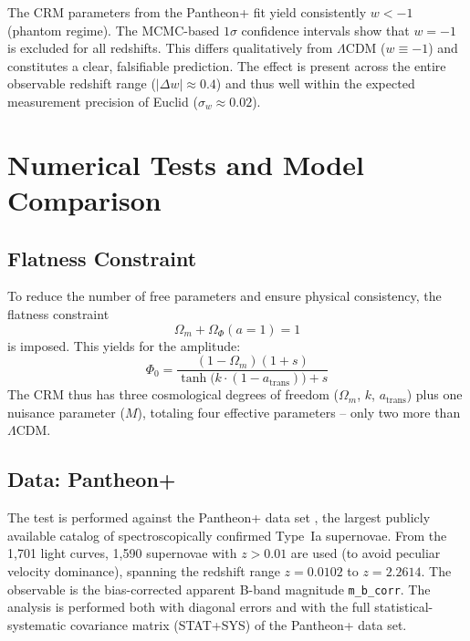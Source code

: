 \documentclass[aps,prd,twocolumn,superscriptaddress,nofootinbib]{revtex4-2}
\begin{document}
The CRM parameters from the Pantheon+ fit yield consistently $w < -1$ (phantom regime). The MCMC-based $1\sigma$ confidence intervals show that $w = -1$ is excluded for all redshifts. This differs qualitatively from $\Lambda$CDM ($w \equiv -1$) and constitutes a clear, falsifiable prediction. The effect is present across the entire observable redshift range ($|\Delta w| \approx 0.4$) and thus well within the expected measurement precision of Euclid ($\sigma_w \approx 0.02$).


\section{Numerical Tests and Model Comparison}
\label{sec:numerics}


\subsection{Flatness Constraint}
\label{subsec:flatness}

To reduce the number of free parameters and ensure physical consistency, the flatness constraint
\begin{equation}
\Omega_m + \Omega_\Phi(a{=}1) = 1
\label{eq:flatness}
\end{equation}
is imposed. This yields for the amplitude:
\begin{equation}
\Phi_0 = \frac{(1 - \Omega_m)(1 + s)}{\tanh\!\big(k\cdot(1 - a_{\mathrm{trans}})\big) + s}
\end{equation}
The CRM thus has three cosmological degrees of freedom ($\Omega_m$, $k$, $a_{\mathrm{trans}}$) plus one nuisance parameter ($M$), totaling four effective parameters -- only two more than $\Lambda$CDM.

\subsection{Data: Pantheon+}
\label{subsec:pantheonplus}

The test is performed against the Pantheon+ data set \cite{Scolnic2022}, the largest publicly available catalog of spectroscopically confirmed Type~Ia supernovae. From the 1,701 light curves, 1,590 supernovae with $z > 0.01$ are used (to avoid peculiar velocity dominance), spanning the redshift range $z = 0.0102$ to $z = 2.2614$. The observable is the bias-corrected apparent B-band magnitude \texttt{m\_b\_corr}. The analysis is performed both with diagonal errors and with the full statistical-systematic covariance matrix (STAT+SYS) of the Pantheon+ data set.
\end{document}
